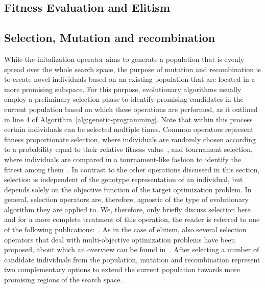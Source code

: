 \subsection{Fitness Evaluation and Elitism}
\subsection{Selection, Mutation and recombination}
While the initalization operator aims to generate a population that is evenly spread over the whole search space, the purpose of mutation and recombination is to create novel individuals based on an existing population that are located in a more promising subspace.  
For this purpose, evolutionary algorithms usually employ a preliminary selection phase to identify promising candidates in the current population based on which these operations are performed, as it outlined in line 4 of Algorithm~\ref{alg:genetic-programming}.
Note that within this process certain individuals can be selected multiple times.
Common operators represent fitness proportionate selection, where individuals are randomly chosen according to a probability equal to their relative fitness value~\cite{lipowski2012roulette}, and tournament selection, where individuals are compared in a tournament-like fashion to identify the fittest among them~\cite{fang2010review}.
In contrast to the other operations discussed in this section, selection is independent of the genotype representation of an individual, but depends solely on the objective function of the target optimization problem.
In general, selection operators are, therefore, agnostic of the type of evolutionary algorithm they are applied to. 
We, therefore, only briefly discuss selection here and for a more complete treatment of this operation, the reader is referred to one of the following publications:~\cite{back1997handbook,beyer2002evolution,goldberg1991comparative}.
As in the case of elitism, also several selection operators that deal with multi-objective optimization problems have been proposed, about which an overview can be found in~\cite{deb2015multi}.
After selecting a number of candidate individuals from the population, mutation and recombination represent two complementary options to extend the current population towards more promising regions of the search space.
